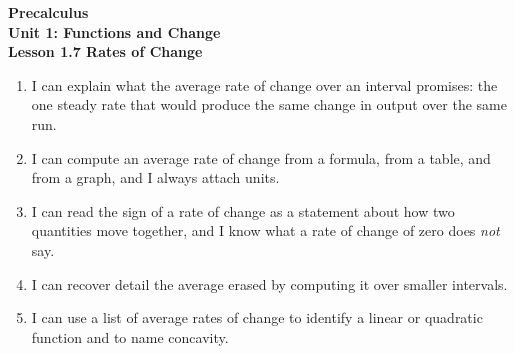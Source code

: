 \documentclass[10pt]{article}
\begin{document}
\vspace{-0.8in}

\begin{center}
  {\color{white}\textbf{\LARGE Precalculus}}\\[4pt]
  {\color{lilacmid}\large\textbf{Unit 1: Functions and Change}}\\[6pt]
  {\color{white}\textbf{\large Lesson 1.7 \quad Rates of Change}}
\end{center}

\vspace{0.22in}
\namedateperiod
\vspace{0.18in}

\begin{learningtargetbox}
\small
\begin{enumerate}[leftmargin=1.5em, itemsep=5pt]
  \item I can explain what the average rate of change over an interval
        promises: the one steady rate that would produce the same change in
        output over the same run.
  \item I can compute an average rate of change from a formula, from a table,
        and from a graph, and I always attach units.
  \item I can read the sign of a rate of change as a statement about how two
        quantities move together, and I know what a rate of change of zero
        does \textit{not} say.
  \item I can recover detail the average erased by computing it over smaller
        intervals.
  \item I can use a list of average rates of change to identify a linear or
        quadratic function and to name concavity.
\end{enumerate}
\end{learningtargetbox}

\vspace{0.14in}
\end{document}
